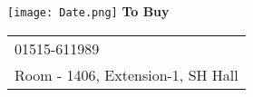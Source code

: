 \documentclass{article}
\begin{document}
\vspace*{\fill}
\begin{center}
  \texttt{[image: Date.png]}
  {\Huge\textbf{To Buy}}
\\
  \LARGE
\vspace{2cm}
  \begin{tabular}{l}
 \faPhone{} 01515-611989\\
  \faHome{} Room - 1406, Extension-1, SH Hall
  \end{tabular}
\end{center}
\vspace*{\fill}
 
\end{document}
